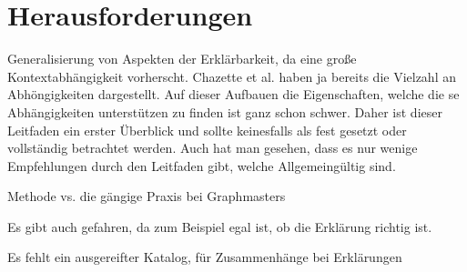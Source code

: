\section{Herausforderungen}

Generalisierung von Aspekten der Erklärbarkeit, da eine große Kontextabhängigkeit vorherscht. Chazette et al. haben ja bereits die Vielzahl an Abhöngigkeiten dargestellt. Auf dieser Aufbauen die Eigenschaften, welche die se Abhängigkeiten unterstützen zu finden ist ganz schon schwer. Daher ist dieser Leitfaden ein erster Überblick und sollte keinesfalls als fest gesetzt oder vollständig betrachtet werden. Auch hat man gesehen, dass es nur wenige Empfehlungen durch den Leitfaden gibt, welche Allgemeingültig sind.

Methode vs. die gängige Praxis bei Graphmasters

Es gibt auch gefahren, da zum Beispiel egal ist, ob die Erklärung richtig ist.

Es fehlt ein ausgereifter Katalog, für Zusammenhänge bei Erklärungen